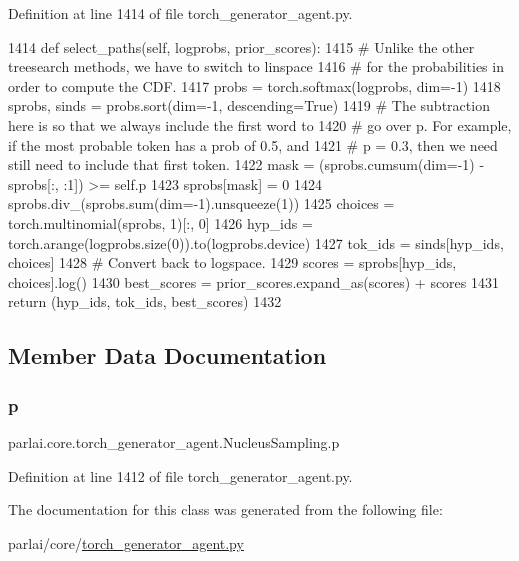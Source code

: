 Definition at line 1414 of file torch\+\_\+generator\+\_\+agent.\+py.


\begin{DoxyCode}
1414     \textcolor{keyword}{def }select\_paths(self, logprobs, prior\_scores):
1415         \textcolor{comment}{# Unlike the other treesearch methods, we have to switch to linspace}
1416         \textcolor{comment}{# for the probabilities in order to compute the CDF.}
1417         probs = torch.softmax(logprobs, dim=-1)
1418         sprobs, sinds = probs.sort(dim=-1, descending=\textcolor{keyword}{True})
1419         \textcolor{comment}{# The subtraction here is so that we always include the first word to}
1420         \textcolor{comment}{# go over p. For example, if the most probable token has a prob of 0.5, and}
1421         \textcolor{comment}{# p = 0.3, then we need still need to include that first token.}
1422         mask = (sprobs.cumsum(dim=-1) - sprobs[:, :1]) >= self.p
1423         sprobs[mask] = 0
1424         sprobs.div\_(sprobs.sum(dim=-1).unsqueeze(1))
1425         choices = torch.multinomial(sprobs, 1)[:, 0]
1426         hyp\_ids = torch.arange(logprobs.size(0)).to(logprobs.device)
1427         tok\_ids = sinds[hyp\_ids, choices]
1428         \textcolor{comment}{# Convert back to logspace.}
1429         scores = sprobs[hyp\_ids, choices].log()
1430         best\_scores = prior\_scores.expand\_as(scores) + scores
1431         \textcolor{keywordflow}{return} (hyp\_ids, tok\_ids, best\_scores)
1432 \end{DoxyCode}


\subsection{Member Data Documentation}
\mbox{\label{classparlai_1_1core_1_1torch__generator__agent_1_1NucleusSampling_a54a43b58e2e2cf7da776c40311e0a3c1}} 
\subsubsection{\texorpdfstring{p}{p}}
{\footnotesize\ttfamily parlai.\+core.\+torch\+\_\+generator\+\_\+agent.\+Nucleus\+Sampling.\+p}



Definition at line 1412 of file torch\+\_\+generator\+\_\+agent.\+py.



The documentation for this class was generated from the following file\+:\begin{DoxyCompactItemize}
\item 
parlai/core/\hyperlink{torch__generator__agent_8py}{torch\+\_\+generator\+\_\+agent.\+py}\end{DoxyCompactItemize}
